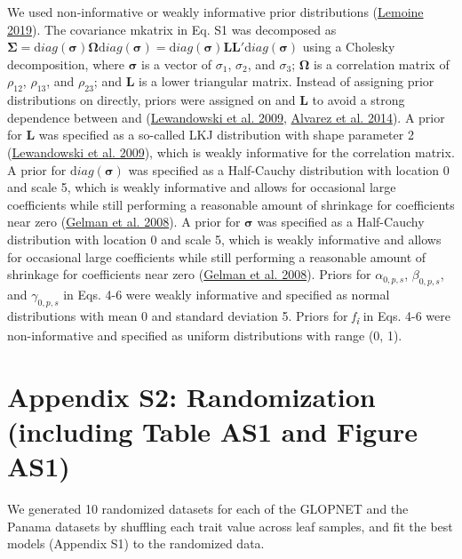 \documentclass[
  12pt,
  letterpaper,
  DIV=11,
  numbers=noendperiod]{scrartcl}
\begin{document}
We used non-informative or weakly informative prior distributions
(\protect\hyperlink{ref-Lemoine2019}{Lemoine 2019}). The covariance
mkatrix in Eq. S1 was decomposed as
\({\mathbf \Sigma} = {\mathrm diag}({\mathbf \sigma}){\mathbf \Omega}{\mathrm diag}({\mathbf \sigma}) = {\mathrm diag}({\mathbf \sigma}){\mathbf L}{\mathbf L}\prime {\mathrm diag}({\mathbf \sigma})\)
using a Cholesky decomposition, where \({\mathbf \sigma}\) is a vector
of \(\sigma_{1}\), \(\sigma_{2}\), and \(\sigma_{3}\);
\({\mathbf \Omega}\) is a correlation matrix of \(\rho_{12}\),
\(\rho_{13}\), and \(\rho_{23}\); and \textbf{L} is a lower triangular
matrix. Instead of assigning prior distributions on directly, priors
were assigned on and \textbf{L} to avoid a strong dependence between and
(\protect\hyperlink{ref-Lewandowski2009}{Lewandowski et al. 2009},
\protect\hyperlink{ref-Alvarez2014}{Alvarez et al. 2014}). A prior for
\textbf{L} was specified as a so-called LKJ distribution with shape
parameter 2 (\protect\hyperlink{ref-Lewandowski2009}{Lewandowski et al.
2009}), which is weakly informative for the correlation matrix. A prior
for \({\mathrm diag}({\mathbf \sigma})\) was specified as a Half-Cauchy
distribution with location 0 and scale 5, which is weakly informative
and allows for occasional large coefficients while still performing a
reasonable amount of shrinkage for coefficients near zero
(\protect\hyperlink{ref-Gelman2008}{Gelman et al. 2008}). A prior for
\(\mathbf{\sigma}\) was specified as a Half-Cauchy distribution with
location 0 and scale 5, which is weakly informative and allows for
occasional large coefficients while still performing a reasonable amount
of shrinkage for coefficients near zero
(\protect\hyperlink{ref-Gelman2008}{Gelman et al. 2008}). Priors for
\(\alpha_{0,p,s}\), \(\beta_{0,p,s}\), and \(\gamma_{0,p,s}\) in Eqs.
4-6 were weakly informative and specified as normal distributions with
mean 0 and standard deviation 5. Priors for \emph{f\textsubscript{i}} in
Eqs. 4-6 were non-informative and specified as uniform distributions
with range (0, 1).

\newpage

\hypertarget{appendix-s2-randomization-including-table-as1-and-figure-as1}{%
\section{Appendix S2: Randomization (including Table AS1 and Figure
AS1)}\label{appendix-s2-randomization-including-table-as1-and-figure-as1}}

We generated 10 randomized datasets for each of the GLOPNET and the
Panama datasets by shuffling each trait value across leaf samples, and
fit the best models (Appendix S1) to the randomized data.
\end{document}
